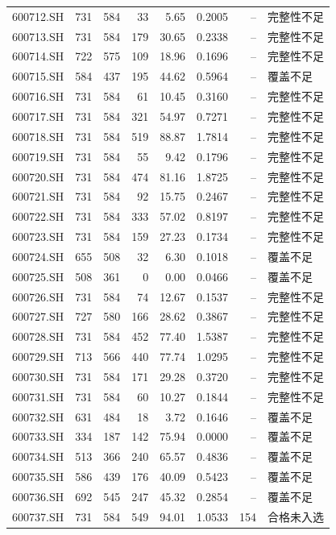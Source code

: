 \documentclass[10pt,a4paper]{article}
\begin{document}
\begin{longtable}{lrrr r r r l}
600712.SH & 731 & 584 & 33 & 5.65 & 0.2005 & -- & 完整性不足\\
600713.SH & 731 & 584 & 179 & 30.65 & 0.2338 & -- & 完整性不足\\
600714.SH & 722 & 575 & 109 & 18.96 & 0.1696 & -- & 完整性不足\\
600715.SH & 584 & 437 & 195 & 44.62 & 0.5964 & -- & 覆盖不足\\
600716.SH & 731 & 584 & 61 & 10.45 & 0.3160 & -- & 完整性不足\\
600717.SH & 731 & 584 & 321 & 54.97 & 0.7271 & -- & 完整性不足\\
600718.SH & 731 & 584 & 519 & 88.87 & 1.7814 & -- & 完整性不足\\
600719.SH & 731 & 584 & 55 & 9.42 & 0.1796 & -- & 完整性不足\\
600720.SH & 731 & 584 & 474 & 81.16 & 1.8725 & -- & 完整性不足\\
600721.SH & 731 & 584 & 92 & 15.75 & 0.2467 & -- & 完整性不足\\
600722.SH & 731 & 584 & 333 & 57.02 & 0.8197 & -- & 完整性不足\\
600723.SH & 731 & 584 & 159 & 27.23 & 0.1734 & -- & 完整性不足\\
600724.SH & 655 & 508 & 32 & 6.30 & 0.1018 & -- & 覆盖不足\\
600725.SH & 508 & 361 & 0 & 0.00 & 0.0466 & -- & 覆盖不足\\
600726.SH & 731 & 584 & 74 & 12.67 & 0.1537 & -- & 完整性不足\\
600727.SH & 727 & 580 & 166 & 28.62 & 0.3867 & -- & 完整性不足\\
600728.SH & 731 & 584 & 452 & 77.40 & 1.5387 & -- & 完整性不足\\
600729.SH & 713 & 566 & 440 & 77.74 & 1.0295 & -- & 完整性不足\\
600730.SH & 731 & 584 & 171 & 29.28 & 0.3720 & -- & 完整性不足\\
600731.SH & 731 & 584 & 60 & 10.27 & 0.1844 & -- & 完整性不足\\
600732.SH & 631 & 484 & 18 & 3.72 & 0.1646 & -- & 覆盖不足\\
600733.SH & 334 & 187 & 142 & 75.94 & 0.0000 & -- & 覆盖不足\\
600734.SH & 513 & 366 & 240 & 65.57 & 0.4836 & -- & 覆盖不足\\
600735.SH & 586 & 439 & 176 & 40.09 & 0.5423 & -- & 覆盖不足\\
600736.SH & 692 & 545 & 247 & 45.32 & 0.2854 & -- & 覆盖不足\\
600737.SH & 731 & 584 & 549 & 94.01 & 1.0533 & 154 & 合格未入选\\

\end{longtable}
\end{document}
